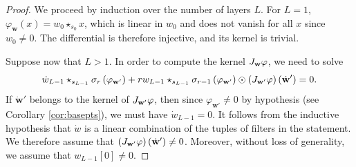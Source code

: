 \documentclass[twoside]{article}
\theoremstyle{plain}%
\theoremstyle{definition}
\theoremstyle{remark}
\newcommand{\conv}[1]{\star_{#1}}
\begin{document}
\begin{proof}
We proceed by induction over the number of layers $L$. For $L=1$,  $\varphi_\mathbf{w}(x) = w_0 \conv{s_0} x$, which is linear in $w_0$ and does not vanish for all $x$ since $w_0 \not = 0$. The differential is therefore injective, and its kernel is trivial. 

Suppose now that $L > 1$. In order to compute the kernel $\textnormal{J}_\mathbf{w} \varphi$, we need to solve
\begin{equation}\label{eq:kerndiff}
   \dot{w}_{L-1} \conv{s_{L-1}} \sigma_r\left(  \varphi_{\mathbf{w}'} \right) + r w_{L-1} \conv{s_{L-1}} \sigma_{r-1}\left(  \varphi_{\mathbf{w}'} \right) \odot \left( \textnormal{J}_\mathbf{w'} \varphi \right)(\dot{\mathbf{w}}') = 0. 
\end{equation}
If $\dot{\mathbf{w}}'$ belongs to the kernel of $\textnormal{J}_\mathbf{w'} \varphi$, then since $\varphi_{\mathbf{w}'} \not = 0$ by hypothesis (see Corollary \ref{cor:basepts}), we must have $\dot{w}_{L-1} = 0$. It follows from the inductive hypothesis that $\dot{w}$ is a linear combination of the tuples of filters in the statement. We therefore assume that $\left( \textnormal{J}_\mathbf{w'} \varphi\right)(\dot{\mathbf{w}}') \not = 0$. Moreover, without loss of generality, we assume that  $w_{L-1}[0] \not = 0$. 


\end{proof}
\end{document}
